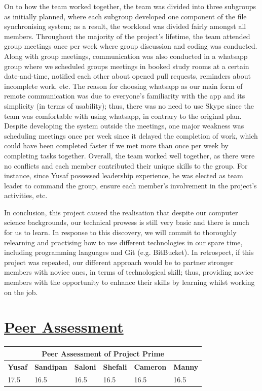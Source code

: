 \documentclass{article}
\begin{document}
\noindent On to how the team worked together, the team was divided into three subgroups as initially planned, where each subgroup developed one component of the file synchronising system; as a result, the workload was divided fairly amongst all members. Throughout the majority of the project's lifetime, the team attended group meetings once per week where group discussion and coding was conducted. Along with group meetings, communication was also conducted in a whatsapp group where we scheduled groups meetings in booked study rooms at a certain date-and-time, notified each other about opened pull requests, reminders about incomplete work, etc. The reason for choosing whatsapp as our main form of remote communication was due to everyone's familiarity with the app and its simplicity (in terms of usability); thus, there was no need to use Skype since the team was comfortable with using whatsapp, in contrary to the original plan. Despite developing the system outside the meetings, one major weakness was scheduling meetings once per week since it delayed the completion of work, which could have been completed faster if we met more than once per week by completing tasks together. Overall, the team worked well together, as there were no conflicts and each member contributed their unique  skills to the group. For instance, since Yusaf possessed leadership experience, he was elected as team leader to command the group, ensure each member's involvement in the project's activities, etc.

\noindent In conclusion, this project caused the realisation that despite our computer science backgrounds, our technical prowess is still very basic and there is much for us to learn. In response to this discovery, we will commit to thoroughly relearning and practising how to use different technologies in our spare time, including programming languages and Git (e.g. BitBucket). In retrospect, if this project was repeated, our different approach would be to partner stronger members with novice ones, in terms of technological skill; thus, providing novice members with the opportunity to enhance their skills by learning whilst working on the job.   

\section{\underline{Peer Assessment}}
\begin{tabular}{|p{2cm}|p{2cm}|p{2cm}|p{2cm}|p{2cm}|p{2cm}|}
\hline
\multicolumn{6}{|c|}{\textbf{Peer Assessment of Project Prime}} \\
\hline
\textbf{Yusaf} & \textbf{Sandipan} & \textbf{Saloni} & \textbf{Shefali} & \textbf{Cameron} & \textbf{Manny} \\
\hline
17.5 & 16.5 & 16.5 & 16.5 & 16.5 & 16.5 \\
\hline
\end{tabular}
	
\end{document}
